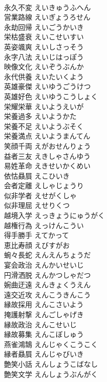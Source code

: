 \documentclass[8pt]{extreport}
\begin{document}
\begin{CJK}{UTF8}{min}
\\	永久不変	えいきゅうふへん	
\\	営業路線	えいぎょうろせん	
\\	永劫回帰	えいごうかいき	
\\	栄枯盛衰	えいこせいすい	
\\	英姿颯爽	えいしさっそう	
\\	永字八法	えいじはっぽう	
\\	映像文化	えいぞうぶんか	
\\	永代供養	えいたいくよう	
\\	英雄豪傑	えいゆうごうけつ	
\\	英雄好色	えいゆうこうしょく	
\\	栄耀栄華	えいようえいが	
\\	栄養過多	えいようかた	
\\	栄養不足	えいようぶそく	
\\	栄養満点	えいようまんてん	
\\	笑顔千両	えがおせんりょう	
\\	益者三友	えきしゃさんゆう	
\\	易姓革命	えきせいかくめい	
\\	依怙贔屓	えこひいき	
\\	会者定離	えしゃじょうり	
\\	似非学者	えせがくしゃ	
\\	似非理屈	えせりくつ	
\\	越境入学	えっきょうにゅうがく	
\\	越権行為	えっけんこうい	
\\	得手勝手	えてかって	
\\	恵比寿顔	えびすがお	
\\	蜿々長蛇	えんえんちょうだ	
\\	宴会政治	えんかいせいじ	
\\	円滑洒脱	えんかつしゃだつ	
\\	婉曲迂遠	えんきょくうえん	
\\	遠交近攻	えんこうきんこう	
\\	縁故採用	えんこさいよう	
\\	掩護射撃	えんごしゃげき	
\\	縁故政治	えんこせいじ	
\\	縁故募集	えんこぼしゅう	
\\	燕雀鴻鵠	えんじゃくこうこく	
\\	縁者贔屓	えんじゃびいき	
\\	艶笑小話	えんしょうこばなし	
\\	艶笑文学	えんしょうぶんがく	

\end{CJK}
\end{document}

